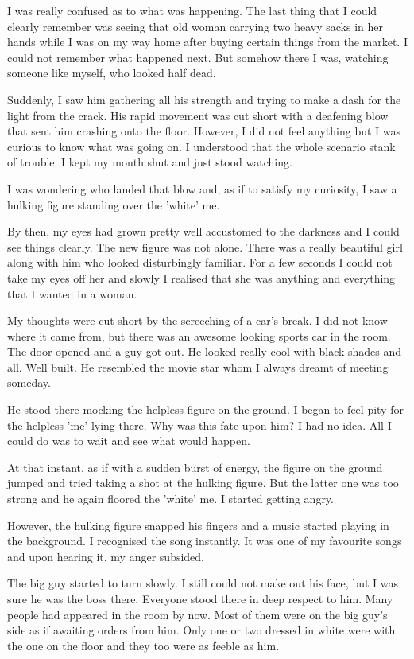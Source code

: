 \documentclass[twoside,11pt]{article}
\begin{document}
I was really confused as to what was happening. The last thing that I could clearly remember was seeing that old woman carrying two heavy sacks in her hands while I was on my way home after buying certain things from the market. I could not remember what happened next. But somehow there I was, watching someone like myself, who looked half dead.

Suddenly, I saw him gathering all his strength and trying to make a dash for the light from the crack. His rapid movement was cut short with a deafening blow that sent him crashing onto the floor. However, I did not feel anything but I was curious to know what was going on. I understood that the whole scenario stank of trouble. I kept my mouth shut and just stood watching.

I was wondering who landed that blow and, as if to satisfy my curiosity, I saw a hulking figure standing over the 'white' me.

By then, my eyes had grown pretty well accustomed to the darkness and I could see things clearly. The new figure was not alone. There was a really beautiful girl along with him who looked disturbingly familiar. For a few seconds I could not take my eyes off her and slowly I realised that she was anything and everything that I wanted in a woman.

My thoughts were cut short by the screeching of a car's break. I did not know where it came from, but there was an awesome looking sports car in the room. The door opened and a guy got out. He looked really cool with black shades and all. Well built. He resembled the movie star whom I always dreamt of meeting someday.

He stood there mocking the helpless figure on the ground. I began to feel pity for the helpless 'me' lying there. Why was this fate upon him? I had no idea. All I could do was to wait and see what would happen.

At that instant, as if with a sudden burst of energy, the figure on the ground jumped and tried taking a shot at the hulking figure. But the latter one was too strong and he again floored the 'white' me. I started getting angry.

However, the hulking figure snapped his fingers and a music started playing in the background. I recognised the song instantly. It was one of my favourite songs and upon hearing it, my anger subsided.

The big guy started to turn slowly. I still could not make out his face, but I was sure he was the boss there. Everyone stood there in deep respect to him. Many people had appeared in the room by now. Most of them were on the big guy's side as if awaiting orders from him. Only one or two dressed in white were with the one on the floor and they too were as feeble as him.
\end{document}
